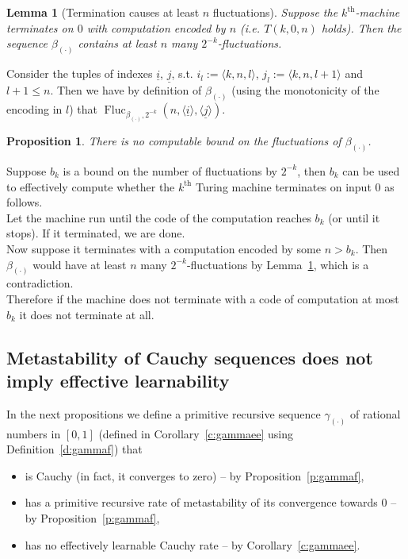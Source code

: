 \documentclass[1p]{elsarticle}
\DeclareMathOperator{\Fluc}{Fluc}
\newcommand{\tup}{\underline} %
\theoremstyle{plain}
\newtheorem{lemma}[thm]{Lemma}
\newtheorem{prop}[thm]{Proposition}
\theoremstyle{definition}
\theoremstyle{remark}
\renewenvironment{proof}[1][]{\noindent{\bf Proof{#1}. }}{\nopagebreak[4]{\hspace*{\fill}
  $\Box$              %
 }{\vspace{2ex}}}
\newcommand{\nbd}{\nobreakdash-}
\theoremstyle{definition}
\begin{document}
{\begin{lemma}[Termination causes at least $n$ fluctuations]\label{l:2n}
Suppose the $k^\text{th}$-machine terminates on $0$ with computation encoded by $n$ (i.e. $T(k,0,n)$ holds). Then the sequence $\beta_{(\cdot)}$ contains at 
least $n$ many $2^{-k}$\nbd fluctuations.
\end{lemma}
\begin{proof}
Consider the tuples of indexes $\tup i$, $\tup j$, 
s.t. $i_l:=\langle k,n,l\rangle$, $j_l:=\langle k,n,l+1\rangle$ and $l+1\leq n$. Then we have by definition of $\beta_{(\cdot)}$ (using the monotonicity of the encoding in $l$) that
$
\Fluc_{\beta_{(\cdot)},2^{-k}}(n,\langle \tup i \rangle, \langle \tup j\rangle).
$
\end{proof}

\begin{prop}\label{p:alphaHasNoFlucBd}
There is no computable bound on the fluctuations of $\beta_{(\cdot)}$.
\end{prop}
\begin{proof}
Suppose $b_k$ is a bound on the number of fluctuations by $2^{-k}$, 
then $b_k$ can be used to effectively compute whether the $k^{\text{th}}$ Turing machine terminates on input $0$ as follows.\\
Let the machine run until the code of the computation reaches $b_k$ (or until it stops). If it terminated, we are done.\\
Now suppose it terminates with a computation encoded by some $n>b_k$. Then $\beta_{(\cdot)}$ would have at least $n$ many $2^{-k}$\nbd fluctuations by Lemma~\ref{l:2n}, which is a contradiction.\\
Therefore if the machine does not terminate with a code of computation at most $b_k$ it does not terminate at all.
\end{proof}



\subsection{Metastability of Cauchy sequences does not imply effective learnability} \label{section4.2}

In the next propositions we define a primitive recursive sequence 
$\gamma_{(\cdot)}$ of rational numbers in $[0,1]$ 
(defined in Corollary~\ref{c:gammaee} using Definition~\ref{d:gammaf}) that
\begin{itemize}
\item is Cauchy (in fact, it converges to zero) -- by 
Proposition~\ref{p:gammaf},
\item has a primitive recursive rate of metastability of its 
convergence towards $0$ -- by Proposition~\ref{p:gammaf},
\item has no effectively learnable Cauchy rate -- by Corollary~\ref{c:gammaee}.
\end{itemize}

}
\end{document}
